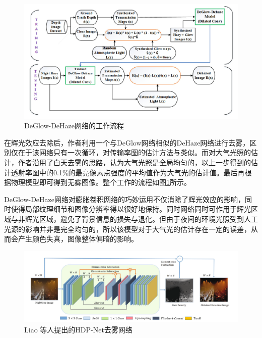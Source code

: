 \begin{figure}[H]
\centering
\includegraphics[width=0.75\linewidth]{pics/screenshot005}
\caption{DeGlow-DeHaze网络的工作流程}
\label{fig:screenshot005}
\end{figure}
\begin{multicols}{2}
在辉光效应去除后，作者利用一个与DeGlow网络相似的DeHaze网络进行去雾，区别仅在于该网络只有一次循环，对传输率图的估计方法与\cite{21}类似。而对大气光照的估计，作者沿用了白天去雾的思路，认为大气光照是全局均匀的，以上一步得到的估计透射率图中的0.1\%的最亮像素点强度的平均值作为大气光的估计值。最后再根据物理模型即可得到无雾图像。整个工作的流程如图\ref{fig:screenshot005}所示。

DeGlow-DeHaze网络对膨胀卷积网络的巧妙运用不仅消除了辉光效应的影响，同时使得局部纹理细节和图像分辨率得以很好地保持。同时网络同时可作用于辉光区域与非辉光区域，避免了背景信息的损失与退化。但由于夜间的环境光照受到人工光源的影响并非是完全均匀的，所以该模型对于大气光的估计存在一定的误差，从而会产生颜色失真，图像整体偏暗的影响。

\end{multicols}

\begin{figure}[H]
	\centering
	\includegraphics[width=1.0\linewidth]{pics/screenshot006}
	\caption{Liao 等人提出的HDP-Net去雾网络}
	\label{fig:screenshot006}
\end{figure}

